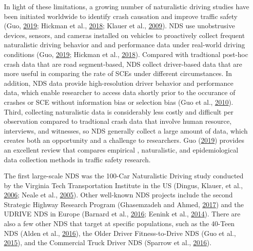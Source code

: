 \documentclass[12pt]{book}
\numberwithin{equation}{chapter}
\begin{document}
In light of these limitations, a growing number of naturalistic driving studies have been initiated worldwide to identify crash causation and improve traffic safety (Guo, \protect\hyperlink{ref-guo2019statistical}{2019}; Hickman et al., \protect\hyperlink{ref-hickman2018synthetic}{2018}; Klauer et al., \protect\hyperlink{ref-klauer2009comparing}{2009}).
NDS use unobstrusive devices, sensors, and cameras installed on vehicles to proactively collect frequent naturalistic driving behavior and and performance data under real-world driving conditions (Guo, \protect\hyperlink{ref-guo2019statistical}{2019}; Hickman et al., \protect\hyperlink{ref-hickman2018synthetic}{2018}). Compared with tradtional post-hoc crash data that are road segment-based, NDS collect driver-based data that are more useful in comparing the rate of SCEs under different circumstances. In addition, NDS data provide high-resolution driver behavior and performance data, which enable researcher to access data shortly prior to the occurance of crashes or SCE without information bias or selection bias (Guo et al., \protect\hyperlink{ref-guo2010near}{2010}). Third, collecting naturalistic data is considerably less costly and difficult per observation compared to tradtional crash data that involve human resource, interviews, and witnesses, so NDS generally collect a large amount of data, which creates both an opportunity and a challenge to researchers. Guo (\protect\hyperlink{ref-guo2019statistical}{2019}) provides an excellent review that compares empirical , naturalistic, and epidemiological data collection methods in traffic safety research.

The first large-scale NDS was the 100-Car Naturalistic Driving study conducted by the Virginia Tech Transportation Institute in the US (Dingus, Klauer, et al., \protect\hyperlink{ref-dingus2006100}{2006}; Neale et al., \protect\hyperlink{ref-neale2005overview}{2005}). Other well-known NDS projects include the second Strategic Highway Research Program (Ghasemzadeh and Ahmed, \protect\hyperlink{ref-ghasemzadeh2017probit}{2017}) and the UDRIVE NDS in Europe (Barnard et al., \protect\hyperlink{ref-barnard2016study}{2016}; Eenink et al., \protect\hyperlink{ref-eenink2014udrive}{2014}). There are also a few other NDS that target at specific populations, such as the 40-Teen NDS (Alden et al., \protect\hyperlink{ref-alden2016animal}{2016}), the Older Driver Fitness-to-Drive NDS (Guo et al., \protect\hyperlink{ref-guo2015older}{2015}), and the Commercial Truck Driver NDS (Sparrow et al., \protect\hyperlink{ref-sparrow2016naturalistic}{2016}).
\end{document}
